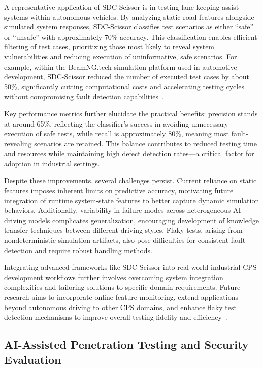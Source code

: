 \documentclass[sigconf]{acmart}
\begin{document}
A representative application of SDC-Scissor is in testing lane keeping assist systems within autonomous vehicles. By analyzing static road features alongside simulated system responses, SDC-Scissor classifies test scenarios as either ``safe'' or ``unsafe'' with approximately 70\% accuracy. This classification enables efficient filtering of test cases, prioritizing those most likely to reveal system vulnerabilities and reducing execution of uninformative, safe scenarios. For example, within the BeamNG.tech simulation platform used in automotive development, SDC-Scissor reduced the number of executed test cases by about 50\%, significantly cutting computational costs and accelerating testing cycles without compromising fault detection capabilities~\cite{ref29}.

Key performance metrics further elucidate the practical benefits: precision stands at around 65\%, reflecting the classifier's success in avoiding unnecessary execution of safe tests, while recall is approximately 80\%, meaning most fault-revealing scenarios are retained. This balance contributes to reduced testing time and resources while maintaining high defect detection rates—a critical factor for adoption in industrial settings.

Despite these improvements, several challenges persist. Current reliance on static features imposes inherent limits on predictive accuracy, motivating future integration of runtime system-state features to better capture dynamic simulation behaviors. Additionally, variability in failure modes across heterogeneous AI driving models complicates generalization, encouraging development of knowledge transfer techniques between different driving styles. Flaky tests, arising from nondeterministic simulation artifacts, also pose difficulties for consistent fault detection and require robust handling methods.

Integrating advanced frameworks like SDC-Scissor into real-world industrial CPS development workflows further involves overcoming system integration complexities and tailoring solutions to specific domain requirements. Future research aims to incorporate online feature monitoring, extend applications beyond autonomous driving to other CPS domains, and enhance flaky test detection mechanisms to improve overall testing fidelity and efficiency~\cite{ref29}.

\subsection{AI-Assisted Penetration Testing and Security Evaluation}
\end{document}
